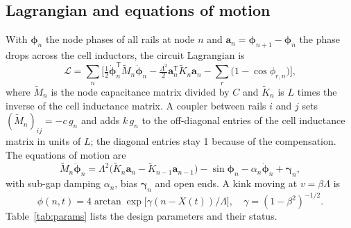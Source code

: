 \documentclass[10pt,twocolumn,letterpaper]{article}
\begin{document}
\subsection{Lagrangian and equations of motion}
With $\boldsymbol\phi_n$ the node phases of all rails at node $n$ and $\mathbf a_n=\boldsymbol\phi_{n+1}-
\boldsymbol\phi_n$ the phase drops across the cell inductors, the circuit Lagrangian is
\begin{equation}
\mathcal L=\sum_n\Big[\tfrac12\dot{\boldsymbol\phi}_n^{\mathsf T}\tilde M_n\dot{\boldsymbol\phi}_n
-\tfrac{\Lambda^2}{2}\mathbf a_n^{\mathsf T}\tilde K_n\mathbf a_n-\sum_r\big(1-\cos\phi_{r,n}\big)\Big],
\label{eq:lagrangian}
\end{equation}
where $\tilde M_n$ is the node capacitance matrix divided by $C$ and $\tilde K_n$ is $L$ times the inverse of the cell
inductance matrix. A coupler between rails $i$ and $j$ sets $(\tilde M_n)_{ij}=-c\,g_n$ and adds $k\,g_n$ to the
off-diagonal entries of the cell inductance matrix in units of $L$; the diagonal entries stay 1 because of the
compensation. The equations of motion are
\begin{equation}
\tilde M_n\ddot{\boldsymbol\phi}_n=\Lambda^2\big(\tilde K_n\mathbf a_n-\tilde K_{n-1}\mathbf a_{n-1}\big)
-\sin\boldsymbol\phi_n-\alpha_n\dot{\boldsymbol\phi}_n+\boldsymbol\gamma_n ,
\label{eq:eom}
\end{equation}
with sub-gap damping $\alpha_n$, bias $\boldsymbol\gamma_n$ and open ends. A kink moving at $v=\beta\Lambda$ is
\begin{equation}
\phi(n,t)=4\arctan\exp\!\big[\gamma(n-X(t))/\Lambda\big],\quad \gamma=(1-\beta^2)^{-1/2}.
\label{eq:kink}
\end{equation}
Table~\ref{tab:params} lists the design parameters and their status.
\end{document}
